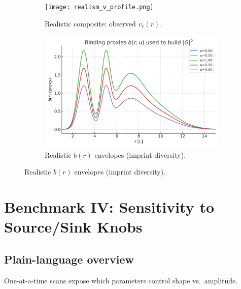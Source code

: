 \documentclass[12pt,a4paper,oneside]{scrreprt}
\begin{document}
\begin{figure}[htbp]\centering
  \begin{subfigure}[t]{0.49\linewidth}
    \texttt{[image: realism\_v\_profile.png]}
    \caption{Realistic composite: observed $v_r(r)$.}
    \label{fig:real:vr}
  \end{subfigure}\hfill
  \begin{subfigure}[t]{0.49\linewidth}
    \includegraphics[width=\linewidth]{realism_b_profiles.png}
    \caption{Realistic $b(r)$ envelopes (imprint diversity).}
    \label{fig:real:b}
  \end{subfigure}
\end{figure}

\chapter{Benchmark IV: Sensitivity to Source/Sink Knobs}
\section*{Plain-language overview}
One-at-a-time scans expose which parameters control shape vs.\ amplitude.
\end{document}
